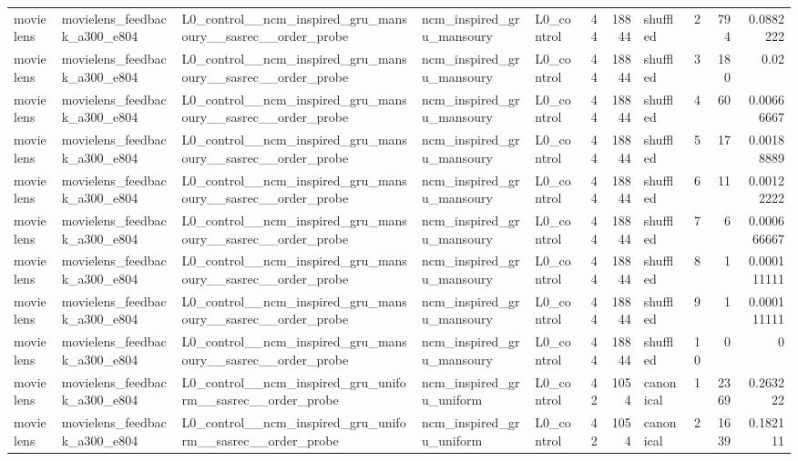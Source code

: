 \begin{table}[htbp!]
\begin{tabular}{lllllrrlrrr}
movielens & movielens\_feedback\_a300\_e804 & L0\_control\_\_ncm\_inspired\_gru\_mansoury\_\_sasrec\_\_order\_probe & ncm\_inspired\_gru\_mansoury & L0\_control & 44 & 18844 & shuffled & 2 & 794 & 0.0882222 \\
movielens & movielens\_feedback\_a300\_e804 & L0\_control\_\_ncm\_inspired\_gru\_mansoury\_\_sasrec\_\_order\_probe & ncm\_inspired\_gru\_mansoury & L0\_control & 44 & 18844 & shuffled & 3 & 180 & 0.02 \\
movielens & movielens\_feedback\_a300\_e804 & L0\_control\_\_ncm\_inspired\_gru\_mansoury\_\_sasrec\_\_order\_probe & ncm\_inspired\_gru\_mansoury & L0\_control & 44 & 18844 & shuffled & 4 & 60 & 0.00666667 \\
movielens & movielens\_feedback\_a300\_e804 & L0\_control\_\_ncm\_inspired\_gru\_mansoury\_\_sasrec\_\_order\_probe & ncm\_inspired\_gru\_mansoury & L0\_control & 44 & 18844 & shuffled & 5 & 17 & 0.00188889 \\
movielens & movielens\_feedback\_a300\_e804 & L0\_control\_\_ncm\_inspired\_gru\_mansoury\_\_sasrec\_\_order\_probe & ncm\_inspired\_gru\_mansoury & L0\_control & 44 & 18844 & shuffled & 6 & 11 & 0.00122222 \\
movielens & movielens\_feedback\_a300\_e804 & L0\_control\_\_ncm\_inspired\_gru\_mansoury\_\_sasrec\_\_order\_probe & ncm\_inspired\_gru\_mansoury & L0\_control & 44 & 18844 & shuffled & 7 & 6 & 0.000666667 \\
movielens & movielens\_feedback\_a300\_e804 & L0\_control\_\_ncm\_inspired\_gru\_mansoury\_\_sasrec\_\_order\_probe & ncm\_inspired\_gru\_mansoury & L0\_control & 44 & 18844 & shuffled & 8 & 1 & 0.000111111 \\
movielens & movielens\_feedback\_a300\_e804 & L0\_control\_\_ncm\_inspired\_gru\_mansoury\_\_sasrec\_\_order\_probe & ncm\_inspired\_gru\_mansoury & L0\_control & 44 & 18844 & shuffled & 9 & 1 & 0.000111111 \\
movielens & movielens\_feedback\_a300\_e804 & L0\_control\_\_ncm\_inspired\_gru\_mansoury\_\_sasrec\_\_order\_probe & ncm\_inspired\_gru\_mansoury & L0\_control & 44 & 18844 & shuffled & 10 & 0 & 0 \\
movielens & movielens\_feedback\_a300\_e804 & L0\_control\_\_ncm\_inspired\_gru\_uniform\_\_sasrec\_\_order\_probe & ncm\_inspired\_gru\_uniform & L0\_control & 42 & 1054 & canonical & 1 & 2369 & 0.263222 \\
movielens & movielens\_feedback\_a300\_e804 & L0\_control\_\_ncm\_inspired\_gru\_uniform\_\_sasrec\_\_order\_probe & ncm\_inspired\_gru\_uniform & L0\_control & 42 & 1054 & canonical & 2 & 1639 & 0.182111 \\

\end{tabular}
\end{table}
